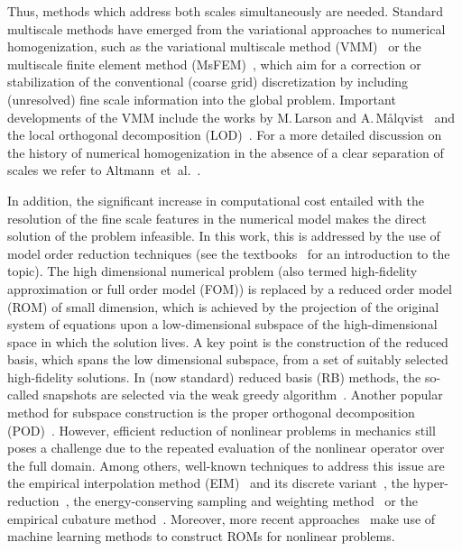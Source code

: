 \documentclass[AMA,STIX1COL,doublespace]{WileyNJD-v2}
\begin{document}
Thus, methods which address both scales simultaneously are needed.
Standard multiscale methods have emerged from the variational approaches to numerical homogenization, such as the variational multiscale method (VMM)~\cite{Hughes1995,HughesFeijooEtAl1998} or the multiscale finite element method (MsFEM)~\cite{HW1997}, which aim for a correction or stabilization of the conventional (coarse grid) discretization by including (unresolved) fine scale information into the global problem.
Important developments of the VMM include the works by M.\,Larson and A.\,Målqvist~\cite{LarsonMalqvist2005,LarsonMalqvist2007,LarsonMalqvist2009} and the local orthogonal decomposition (LOD)~\cite{MalqvistPeterseim2014}.
For a more detailed discussion on the history of numerical homogenization in the absence of a clear separation of scales we refer to Altmann~et~al.~\cite{AltmannHenningPeterseim2021}.

In addition, the significant increase in computational cost entailed with the resolution of the fine scale features in the numerical model makes the direct
solution of the problem infeasible.
In this work, this is addressed by the use of model order reduction techniques (see the textbooks~\cite{HesthavenRozzaStamm2016,QuarteroniManzoniNegri2016} for an introduction to the topic).
The high dimensional numerical problem (also termed high-fidelity approximation or full order model (FOM)) is replaced by a reduced order model (ROM) of small dimension, which is achieved by the projection of the original system of equations upon a low-dimensional subspace of the high-dimensional space in which the solution lives.
A key point is the construction of the reduced basis, which spans the low dimensional subspace, from a set of suitably selected high-fidelity solutions. 
In (now standard) reduced basis (RB) methods, the so-called snapshots are selected via the weak greedy algorithm~\cite{PrudhommeEtAl2002,VeroyEtAl2003}.
Another popular method for subspace construction is the proper orthogonal decomposition (POD)~\cite{HolmesEtAl2012,KunischVolkwein2002}.
However, efficient reduction of nonlinear problems in mechanics still poses a challenge due to the repeated evaluation of the nonlinear operator over the full domain.
Among others, well-known techniques to address this issue are the empirical interpolation method (EIM)~\cite{BarraultEtAl2004} and its discrete variant~\cite{Chaturantabut2010}, the hyper-reduction~\cite{Ryckelynck2005,Ryckelynck2009}, the energy-conserving sampling and weighting method~\cite{FarhatEtAl2014,FarhatEtAl2015} or the empirical cubature method~\cite{HernandezCaicedoFerrer2016}.
Moreover, more recent approaches~\cite{GuoHesthaven2018,RaissiEtAl2019} make use of machine learning methods to construct ROMs for nonlinear problems.
\end{document}
